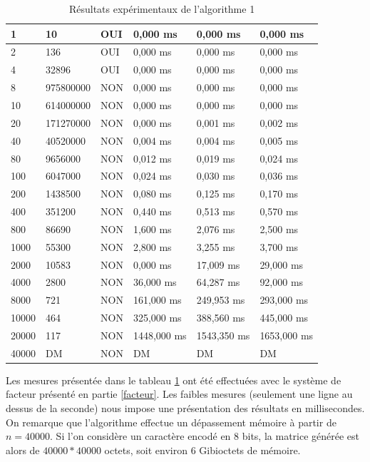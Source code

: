 \begin{table}[p]
{\begin{center}
\begin{tabular}{||p{1cm}||p{2.5cm}|p{2.5cm}|p{2.5cm}|p{2.5cm}|p{2.5cm}||}
1 & 10 & OUI& 0,000 ms & 0,000 ms & 0,000 ms\\\hline
2 & 136 & OUI & 0,000 ms & 0,000 ms & 0,000 ms\\\hline
4 & 32896 & OUI & 0,000 ms & 0,000 ms & 0,000 ms\\\hline
8 & 975800000 & NON & 0,000 ms & 0,000 ms & 0,000 ms\\\hline
10 & 614000000 & NON & 0,000 ms & 0,000 ms & 0,000 ms\\\hline
20 & 171270000 & NON & 0,000 ms & 0,001 ms & 0,002 ms\\\hline
40 & 40520000 & NON & 0,004 ms & 0,004 ms & 0,005 ms\\\hline
80 & 9656000 & NON & 0,012 ms & 0,019 ms & 0,024 ms\\\hline
100 & 6047000 & NON & 0,024 ms & 0,030 ms & 0,036 ms\\\hline
200 & 1438500 & NON & 0,080 ms & 0,125 ms & 0,170 ms\\\hline
400 & 351200 & NON & 0,440 ms & 0,513 ms & 0,570 ms\\\hline
800 & 86690 & NON & 1,600 ms & 2,076 ms & 2,500 ms\\\hline
1000 & 55300 & NON & 2,800 ms & 3,255 ms & 3,700 ms\\\hline
2000 & 10583 & NON & 0,000 ms & 17,009 ms & 29,000 ms\\\hline
4000 & 2800 & NON & 36,000 ms & 64,287 ms & 92,000 ms\\\hline
8000 & 721 & NON & 161,000 ms & 249,953 ms & 293,000 ms\\\hline
10000 & 464 & NON & 325,000 ms & 388,560 ms & 445,000 ms\\\hline
20000 & 117 & NON & 1448,000 ms & 1543,350 ms & 1653,000 ms\\\hline
40000 & DM & NON & DM & DM & DM\\\hline\hline
\end{tabular}
\caption{Résultats expérimentaux de l'algorithme 1}
\label{tab1}
\end{center}
}%
\end{table}
Les mesures présentée dans le tableau \ref{tab1} ont été effectuées avec le système de facteur présenté en partie \ref{facteur}.
Les faibles mesures (seulement une ligne au dessus de la seconde) nous impose une présentation des résultats en millisecondes.
On remarque que l'algorithme effectue un dépassement mémoire à partir de $n=40 000$. Si l'on considère un caractère encodé en 8 bits, la matrice générée est alors de $40000*40000$ octets, soit environ 6 Gibioctets de mémoire.
